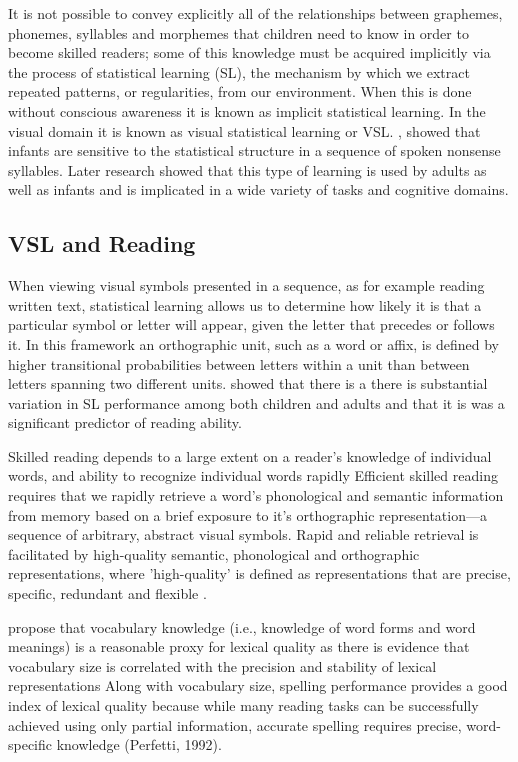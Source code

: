 \documentclass[review]{elsarticle}
\begin{document}
It is not possible to convey explicitly all of the relationships between graphemes, phonemes, syllables and morphemes that children need to know in order to become skilled readers; some of this knowledge must be acquired implicitly via the process of statistical learning (SL), the mechanism by which we extract repeated patterns, or regularities, from our environment.  When this is done without conscious awareness it is known as implicit statistical learning.  In the visual domain it is known as visual statistical learning or VSL.   \citet{saffranWordSegmentationRole1996}, showed that  infants are sensitive to the statistical structure in a sequence of spoken nonsense syllables.  Later research showed that this type of learning is used by adults as well as infants and is implicated in a wide variety of tasks and cognitive domains.

\subsection{ VSL and Reading}

When viewing visual symbols presented in a sequence, as for example reading written text, statistical learning allows us to determine how likely it is that a particular symbol or letter will appear, given the letter that precedes or follows it. In this framework an orthographic unit, such as a word or affix, is defined by higher transitional probabilities between letters within a unit than between letters spanning two different units.	\citet{arciuliStatisticalLearningRelated2012} showed that there is a there is substantial variation in SL performance among both children and adults and that it is was a significant predictor of reading ability.

Skilled reading depends to a large extent on a reader's knowledge of individual words, and  ability to recognize individual words rapidly \citep{rastlePlaceMorphologyLearning2019, castlesHowDoesOrthographic2006}	Efficient skilled reading requires that we rapidly retrieve a word’s phonological and semantic information from memory based on a brief exposure to it's orthographic representation—a sequence of arbitrary, abstract visual symbols.  Rapid and reliable retrieval is facilitated by high-quality semantic, phonological and orthographic \citep{perfettiLexicalQualityRevisited2017} representations, where 'high-quality' is defined as representations that are precise, specific, redundant and flexible \citep{perfettiReadingAbilityLexical2007}. 


\citet{yapIndividualDifferencesJoint2009} propose that vocabulary knowledge (i.e., knowledge of word forms and word meanings) is a reasonable proxy for lexical quality as there is evidence that vocabulary size is correlated with the precision and stability of lexical representations \citep{perfettiReadingAbilityLexical2007, perfettiLexicalQualityHypothesis2002, kiddIndividualDifferencesStatistical2016,kinoshitaAdditiveInteractiveEffects2006, kinoshitaHowLexicalDecision2006}  Along with vocabulary size, spelling performance provides a good index of lexical quality because while many reading tasks can be successfully achieved using only partial information, accurate spelling requires precise, word-specific knowledge (Perfetti, 1992).
\end{document}
